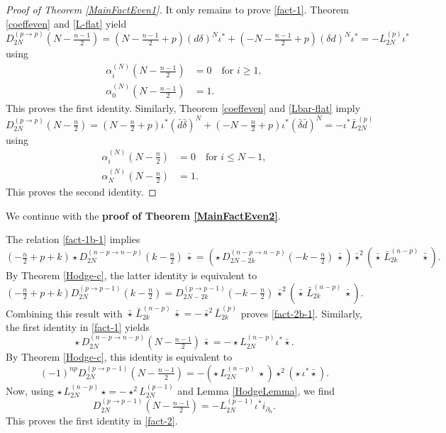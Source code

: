 \documentclass[a4paper,12pt,reqno]{amsart}
\numberwithin{theorem}{subsection}
\numberwithin{equation}{section}
\begin{document}
\begin{proof} [Proof of Theorem \ref{MainFactEven1}]
It only remains to prove \eqref{fact-1}. Theorem \ref{coeffeven} and
\eqref{L-flat} yield
$$
   D_{2N}^{(p \to p)}(N\!-\!\tfrac{n-1}{2}) = (N\!-\!\tfrac{n-1}{2}\!+\!p) ({d}
   \delta)^N \iota^* + (-N\!-\!\tfrac{n-1}{2}\!+\!p) (\delta {d})^N \iota^* = -L_{2N}^{(p)} \iota^*
$$
using
\begin{align*}
   \alpha_i^{(N)}(N\!-\!\tfrac{n-1}{2}) & = 0 \quad \mbox{for $i \ge 1$}, \\
   \alpha_0^{(N)}(N\!-\!\tfrac{n-1}{2}) & = 1.
\end{align*}
This proves the first identity. Similarly, Theorem \ref{coeffeven} and
\eqref{Lbar-flat} imply
$$
   D_{2N}^{(p \to p)}(N\!-\!\tfrac{n}{2}) = (N\!-\!\tfrac{n}{2}\!+\!p) \iota^* (\bar{d} \bar{\delta})^N
   + (-N\!-\!\tfrac{n}{2}\!+\!p) \iota^* (\bar{\delta} \bar{d})^N = - \iota^* \bar{L}_{2N}^{(p)}
$$
using
\begin{align*}
   \alpha_i^{(N)}(N\!-\!\tfrac{n}{2}) & = 0 \quad \mbox{for $i \le N-1$}, \\
   \alpha_N^{(N)}(N\!-\!\tfrac{n}{2}) & = 1.
\end{align*}
This proves the second identity.
\end{proof}

We continue with the {\bf proof of Theorem \ref{MainFactEven2}}.

The relation \eqref{fact-1b-1} implies
$$
   (-\tfrac{n}{2}+p+k) \star D_{2N}^{(n-p \to n-p)}(k-\tfrac n2) \, \bar{\star}
   = \left( \star \, D_{2N-2k}^{(n-p \to n-p)}(-k-\tfrac n2) \, \bar{\star}\right)
   \bar{\star}^2 \left(\bar{\star} \, \bar{L}_{2k}^{(n-p)} \, \bar{\star}\right).
$$
By Theorem \ref{Hodge-c}, the latter identity is equivalent to
$$
   (-\tfrac n2+p+k) D_{2N}^{(p \to p-1)}(k-\tfrac n2)
   = D_{2N-2k}^{(p \to p-1)}(-k-\tfrac n2) \, \bar{\star}^2
   \left(\bar{\star} \, \bar{L}_{2k}^{(n-p)} \, \bar{\star}\right).
$$
Combining this result with $\bar{\star} \, \bar{L}_{2k}^{(n-p)} \, \bar{\star}
= - \bar{\star}^2 \bar{L}_{2k}^{(p)}$ proves \eqref{fact-2b-1}. Similarly, the
first identity in \eqref{fact-1} yields
$$
   \star \, D^{(n-p \to n-p)}_{2N}(N-\tfrac{n-1}{2}) \, \bar{\star} = - \star L^{(n-p)}_{2N} \iota^* \bar{\star}.
$$
By Theorem \ref{Hodge-c}, this identity is equivalent to
$$
   (-1)^{np} D^{(p \to p-1)}_{2N}(N-\tfrac{n-1}{2})
   = - \left(\star \, L^{(n-p)}_{2N} \, \star \right) \star^2 \left(\star \, \iota^* \bar{\star} \right).
$$
Now, using $\star \, L_{2N}^{(n-p)} \, \star = - \star^2 L_{2N}^{(p-1)}$ and
Lemma \ref{HodgeLemma}, we find
$$
   D^{(p \to p-1)}_{2N}(N-\tfrac{n-1}{2}) = - L_{2N}^{(p-1)} \iota^* i_{\partial_n}.
$$
This proves the first identity in \eqref{fact-2}.
\end{document}
